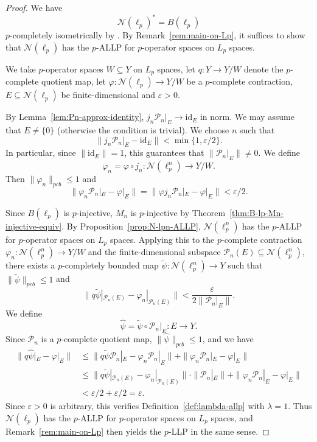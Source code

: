 \documentclass[12pt]{article}
\newcommand{\pcb}{pcb}
\begin{document}
\begin{proof}
We have
\[
        \mathcal{N}(\ell_p)^*=B(\ell_p)
\]
$p$-completely isometrically by \cite[Lemma~5.1]{Daws2007}.
By Remark~\ref{rem:main-on-Lp}, it suffices to show that $\mathcal{N}(\ell_p)$ has the
$p$-ALLP for $p$-operator spaces on $L_p$ spaces.

We take $p$-operator spaces $W\subseteq Y$ on $L_p$ spaces,
let $q:Y\to Y/W$ denote the $p$-complete quotient map, let
$\varphi:\mathcal{N}(\ell_p)\to Y/W$ be a $p$-complete contraction, 
$E\subseteq \mathcal{N}(\ell_p)$ be finite-dimensional and $\varepsilon>0$.

By Lemma~\ref{lem:Pn-approx-identity}, $j_n\mathcal{P}_n|_E\to\mathrm{id}_E$ in norm. We may assume that $E\neq\{0\}$ (otherwise the condition is trivial).
We choose $n$ such that
\[
        \|j_n\mathcal{P}_n|_E-\mathrm{id}_E\|<\min\{1,\varepsilon/2\}.
\]
In particular, since $\|\mathrm{id}_E\|=1$, this guarantees that $\|\mathcal{P}_n|_E\|\neq 0$.
We define
\[
        \varphi_n=\varphi\circ j_n:\mathcal{N}(\ell_p^n)\to Y/W .
\]
Then $\|\varphi_n\|_{\pcb}\leq 1$ and
\[
        \|\varphi_n\mathcal{P}_n|_E-\varphi|_E\|
        =\|\varphi j_n\mathcal{P}_n|_E-\varphi|_E\|<\varepsilon/2 .
\]

Since $B(\ell_p)$ is $p$-injective, $M_n$ is $p$-injective by Theorem~\ref{thm:B-lp-Mn-injective-equiv}.
By Proposition~\ref{prop:N-lpn-ALLP}, $\mathcal{N}(\ell_p^n)$ has the $p$-ALLP for $p$-operator spaces on $L_p$ spaces.
Applying this to the $p$-complete contraction $\varphi_n:\mathcal{N}(\ell_p^n)\to Y/W$ and the finite-dimensional subspace $\mathcal{P}_n(E)\subseteq \mathcal{N}(\ell_p^n)$, there exists a $p$-completely bounded map
$\widetilde\psi:\mathcal{N}(\ell_p^n)\to Y$ such that $\|\widetilde\psi\|_{\pcb}\leq 1$ and
\[
        \|q\widetilde\psi|_{\mathcal{P}_n(E)}-\varphi_n|_{\mathcal{P}_n(E)}\|<\frac{\varepsilon}{2\|\mathcal{P}_n|_E\|}.
\]
We define
\[
        \widehat\psi=\widetilde\psi\circ \mathcal{P}_n|_E:E\to Y.
\]
Since $\mathcal{P}_n$ is a $p$-complete quotient map, $\|\widehat\psi\|_{\pcb}\leq 1$, and we have
\begin{align*}
        \|q\widehat\psi|_E-\varphi|_E\|
        &\leq
        \|q\widetilde\psi \mathcal{P}_n|_E-\varphi_n\mathcal{P}_n|_E\|
        +\|\varphi_n\mathcal{P}_n|_E-\varphi|_E\| \\
        &\leq
        \|q\widetilde\psi|_{\mathcal{P}_n(E)}-\varphi_n|_{\mathcal{P}_n(E)}\| \cdot \|\mathcal{P}_n|_E\|
        +\|\varphi_n\mathcal{P}_n|_E-\varphi|_E\| \\
        &< \varepsilon/2 + \varepsilon/2 = \varepsilon.
\end{align*}
Since $\varepsilon>0$ is arbitrary, this verifies Definition~\ref{def:lambda-allp} with $\lambda=1$.
Thus $\mathcal{N}(\ell_p)$ has the $p$-ALLP for $p$-operator spaces on $L_p$ spaces, and
Remark~\ref{rem:main-on-Lp} then yields the $p$-LLP in the same sense.
\end{proof}
\end{document}
